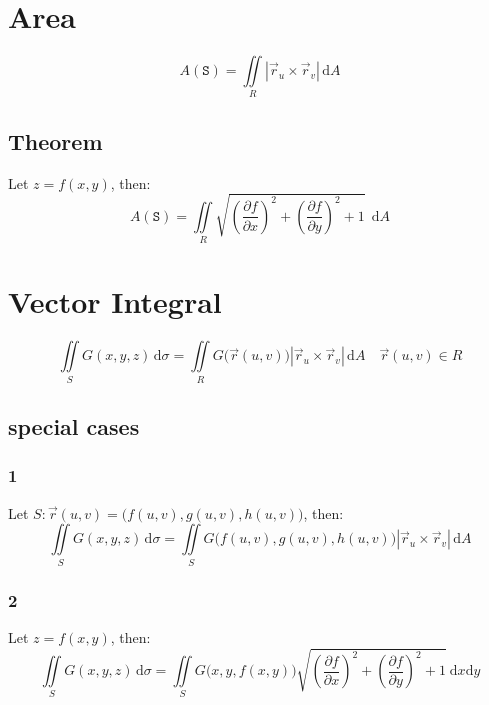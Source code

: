 \documentclass[12pt, fleqn]{book}
\newcommand{\D}{\mathrm{d}}
\begin{document}
	\section{Area}
		\begin{equation}
			A(\mathtt{S}) = \iint\limits_R \left|\vec{r}_u \times \vec{r}_v\right| \, \D A
		\end{equation}
		\subsection{Theorem}
			Let $z = f(x, y)$, then:
			\begin{equation}
				A(\mathtt{S}) = 
				  \iint\limits_R 
				  \sqrt{
				  	(\frac{\partial f}{\partial x})^2 + 
				  	(\frac{\partial f}{\partial y})^2 + 
				  	1
			  	} 
				  \ \ \D A
			\end{equation}
	\section{Vector Integral}
		\begin{equation}
			\iint\limits_S G(x, y, z) \, \D \sigma 
			  = \iint\limits_R G\big(\vec{r}(u, v)\big) 
			    \left|\vec{r}_u \times \vec{r}_v\right| 
			    \, \D A 
			    \quad \vec{r}(u, v) \in R
		\end{equation}
		\subsection{special cases}
			\subsubsection{1}
				Let $S: \vec{r}(u, v) = \big(f(u, v), g(u, v), h(u, v)\big)$, then:
			 	\begin{equation}
			 		\iint\limits_S G(x, y, z) \, \D \sigma
			 		  = \iint\limits_S G\big(f(u, v), g(u, v), h(u, v)\big) 
			 		    \left|\vec{r}_u \times \vec{r}_v\right| 
			 		    \, \D A
			 	\end{equation}
		 	\subsubsection{2}
		 		Let $z = f(x, y)$, then:
		 		\begin{equation}
		 			\iint\limits_S G(x, y, z) \, \D \sigma
		 			  = \iint\limits_S G\big(x, y, f(x, y)\big)
		 			  \sqrt{
		 			  	(\frac{\partial f}{\partial x})^2 + 
		 			  	(\frac{\partial f}{\partial y})^2 + 
		 			  	1
	 			  	  } 
 			  	       \ \D x \D y
		 		\end{equation}
\end{document}

